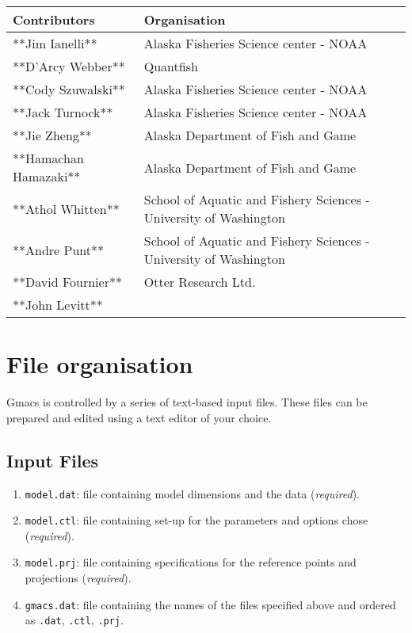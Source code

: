 \documentclass[
]{book}
\providecommand{\tightlist}{%
  \setlength{\itemsep}{0pt}\setlength{\parskip}{0pt}}
\begin{document}
\begin{tabular}{ll}
\toprule
Contributors & Organisation\\
\midrule
**Jim Ianelli** & Alaska Fisheries Science center - NOAA\\
**D'Arcy Webber** & Quantfish\\
**Cody Szuwalski** & Alaska Fisheries Science center - NOAA\\
**Jack Turnock** & Alaska Fisheries Science center - NOAA\\
**Jie Zheng** & Alaska Department of Fish and Game\\
\addlinespace
**Hamachan Hamazaki** & Alaska Department of Fish and Game\\
**Athol Whitten** & School of Aquatic and Fishery Sciences - University of Washington\\
**Andre Punt** & School of Aquatic and Fishery Sciences - University of Washington\\
**David Fournier** & Otter Research Ltd.\\
**John Levitt** & \\
\bottomrule
\end{tabular}

\hypertarget{orga}{%
\chapter{File organisation}\label{orga}}

Gmacs is controlled by a series of text-based input files. These files can be prepared and edited using a text editor of your choice.

\hypertarget{input-files}{%
\section{Input Files}\label{input-files}}

\begin{enumerate}
\def\labelenumi{\arabic{enumi}.}
\tightlist
\item
  \texttt{model.dat}: file containing model dimensions and the data (\emph{required}).
\item
  \texttt{model.ctl}: file containing set-up for the parameters and options chose (\emph{required}).
\item
  \texttt{model.prj}: file containing specifications for the reference points and projections (\emph{required}).
\item
  \texttt{gmacs.dat}: file containing the names of the files specified above and ordered as \texttt{.dat}, \texttt{.ctl}, \texttt{.prj}.
\end{enumerate}
\end{document}
